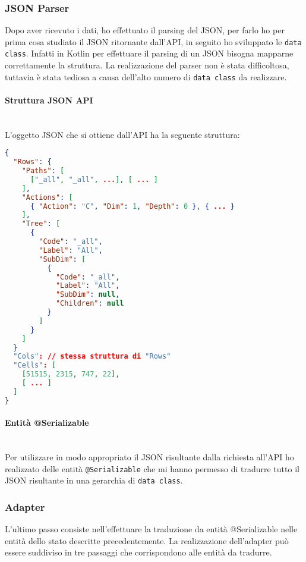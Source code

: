 \subsubsection{JSON Parser}
Dopo aver ricevuto i dati, ho effettuato il parsing del JSON, per farlo ho per prima cosa studiato il JSON ritornante dall'API, in seguito ho sviluppato le \verb|data class|. Infatti in Kotlin per effettuare il parsing di un JSON bisogna mapparne correttamente la struttura.
La realizzazione del parser non è stata difficoltosa, tuttavia è stata tediosa a causa dell'alto numero di \verb|data class| da realizzare.

\paragraph{Struttura JSON API} \mbox{} \\
L'oggetto JSON che si ottiene dall'API ha la seguente struttura:
\begin{lstlisting}[caption={Struttura JSON API}, label={lst:bodycells}, language=json]
{
  "Rows": {
  	"Paths": [
  	  ["_all", "_all", ...], [ ... ]
  	],
  	"Actions": [
  	  { "Action": "C", "Dim": 1, "Depth": 0 }, { ... }
  	],
  	"Tree": [
  	  {
  	    "Code": "_all",
  	    "Label": "All",
  	    "SubDim": [
  	      {
  	        "Code": "_all",
  	        "Label": "All",
  	        "SubDim": null,
  	        "Children": null
  	      }
  	    ]  
  	  }
  	]
  }
  "Cols": // stessa struttura di "Rows"
  "Cells": [
    [51515, 2315, 747, 22],
    [ ... ]
  ]
}
\end{lstlisting}

\paragraph{Entità @Serializable} \mbox{} \\
Per utilizzare in modo appropriato il JSON risultante dalla richiesta all'API ho realizzato delle entità \verb|@Serializable| che mi hanno permesso di tradurre tutto il JSON risultante in una gerarchia di \verb|data class|.

\subsubsection{Adapter}
L'ultimo passo consiste nell'effettuare la traduzione da entità @Serializable nelle entità dello stato descritte precedentemente. La realizzazione dell'adapter può essere suddiviso in tre passaggi che corrispondono alle entità da tradurre.

